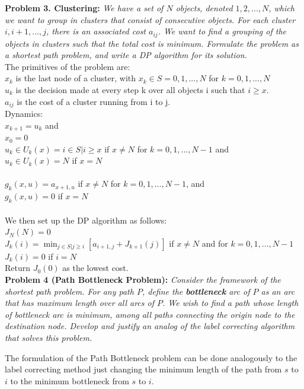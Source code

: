 \documentclass[11pt, english]{article}
\begin{document}
\textbf{Problem 3. Clustering:} \textit{We have a set of $N$ objects, denoted $1, 2, . . . , N$, which we want to group in clusters that consist of consecutive objects. For each cluster $i, i + 1, . . . , j$, there is an associated cost $a_{ij}$. We want to find a grouping of the objects in clusters such that the total cost is minimum. Formulate the problem as a shortest path problem, and write a DP algorithm for its solution.}\\

The primitives of the problem are:\\
$x_k$ is the last node of a cluster, with $x_k \in S = {0, 1, ..., N}$ for $k = 0, 1, ..., N$\\
$u_k$ is the decision made at every step k over all objects i such that $i \geq x$.\\
$a_{ij}$ is the cost of a cluster running from i to j.\\
Dynamics:\\
$x_{k+1} = u_k$ and\\
$x_0 = 0$\\
$u_k \in U_k(x) = {i \in S | i\geq x}$ if $x \neq N$ for $k = 0, 1, ..., N-1$ and\\
$u_k \in U_k(x) = {N}$ if $x= N$\\
\\
$g_k(x, u) = a_{x+1,u}$ if $x \neq N$ for $k = 0, 1, ..., N-1$, and \\
$g_k(x, u) = 0$ if $x = N$\\
\\
We then set up the DP algorithm as follows:\\
$J_N(N) = 0$\\
$J_k(i) = \displaystyle \min_{j \in S|j \geq i}[a_{i+1,j} + J_{k+1}(j)]$ if $x \neq N$ and for $k = 0, 1, ..., N-1$\\
$J_k(i) = 0$ if $i = N$\\
Return $J_0(0)$ as the lowest cost.\\


\textbf{Problem 4 (Path Bottleneck Problem):}\textit{ Consider the framework of the shortest path problem. For any path $P$, define the \textbf{bottleneck} arc of $P$ as an arc that has maximum length over all arcs of $P$. We wish to find a path whose length of bottleneck arc is minimum, among all paths connecting the origin node to the destination node. Develop and justify an analog of the label correcting algorithm that solves this problem. }


The formulation of the Path Bottleneck problem can be done analogously to the label correcting method just changing the minimum length of the path from $s$ to $i$ to the minimum bottleneck from $s$ to $i$.\\
\end{document}
